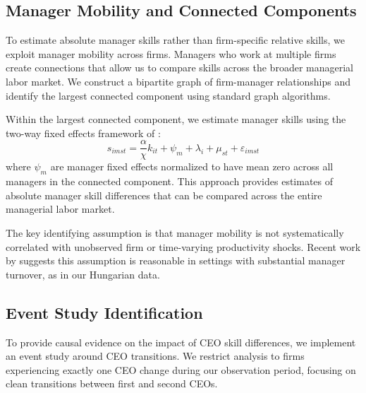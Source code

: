 \documentclass[11pt,a4paper]{article}
\begin{document}


\subsection{Manager Mobility and Connected Components}

To estimate absolute manager skills rather than firm-specific relative skills, we exploit manager mobility across firms. Managers who work at multiple firms create connections that allow us to compare skills across the broader managerial labor market. We construct a bipartite graph of firm-manager relationships and identify the largest connected component using standard graph algorithms.

Within the largest connected component, we estimate manager skills using the two-way fixed effects framework of \citet{abowd1999high}:
\begin{equation}
s_{imst} = \frac{\alpha}{\chi} k_{it} + \psi_m + \lambda_i + \mu_{st} + \varepsilon_{imst}
\end{equation}
where $\psi_m$ are manager fixed effects normalized to have mean zero across all managers in the connected component. This approach provides estimates of absolute manager skill differences that can be compared across the entire managerial labor market.

The key identifying assumption is that manager mobility is not systematically correlated with unobserved firm or time-varying productivity shocks. Recent work by \citet{metcalfe2023managers} suggests this assumption is reasonable in settings with substantial manager turnover, as in our Hungarian data.

\subsection{Event Study Identification}

To provide causal evidence on the impact of CEO skill differences, we implement an event study around CEO transitions. We restrict analysis to firms experiencing exactly one CEO change during our observation period, focusing on clean transitions between first and second CEOs.
\end{document}
